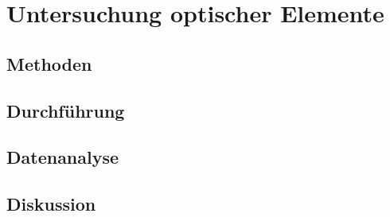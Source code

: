 \section{Untersuchung optischer Elemente}

	\subsection{Methoden}
	
		
	\subsection{Durchführung}
	
	
	\subsection{Datenanalyse}
		
	
	\subsection{Diskussion}
	
